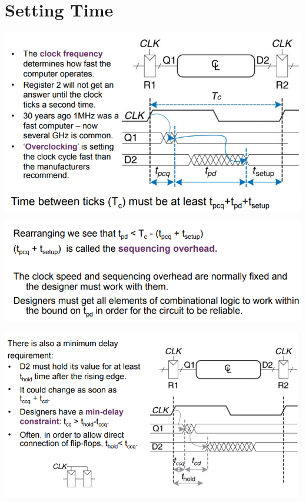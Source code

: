 \documentclass{article}[18pt]
\begin{document}
\section{Setting Time}
\begin{center}
	\includegraphics[scale=0.7]{figure17}
\end{center}
\begin{center}
	\includegraphics[scale=0.7]{figure18}
\end{center}
\begin{center}
	\includegraphics[scale=0.7]{figure19}
\end{center}
\end{document}
